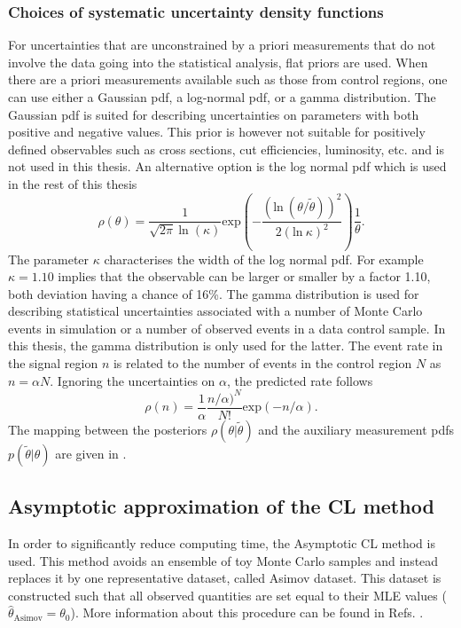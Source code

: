 \subsubsection*{Choices of systematic uncertainty density functions}
For uncertainties that are unconstrained by a priori measurements that do not involve the data going into the statistical analysis, flat priors are used. When there are a priori measurements available such as those from control regions, one can use either a Gaussian pdf,  a log-normal pdf, or a  gamma distribution. The Gaussian pdf is suited for describing uncertainties on parameters with both positive and negative values. This prior is however not suitable for positively defined observables such as cross sections, cut efficiencies, luminosity, etc. and is not used in this thesis. An alternative option is the log normal pdf which is used in the rest of this thesis
\begin{equation}
  \rho(\theta) = \frac{1}{\sqrt{2\pi} \:\mathrm{ln}\;(\kappa)} \mathrm{exp}\left(-\frac{(\mathrm{ln}\:(\theta/\tilde{\theta}))^2}{2 (\mathrm{ln}\: \kappa)^2}\right) \frac{1}{\theta}. 
\end{equation}
The parameter $\kappa$ characterises the width of the log normal pdf. For example $\kappa = 1.10$ implies that the observable can be larger or smaller by a factor 1.10, both deviation having a chance of 16\%. The gamma distribution is used for describing statistical uncertainties associated with a number of Monte Carlo events in simulation or a number of observed events in a data control sample. In this thesis, the gamma distribution is only used for the latter. The event rate in the signal region $n$ is related to the number of events in the control region $N$ as $n= \alpha N$. Ignoring the uncertainties on $\alpha$, the predicted rate follows 
\begin{equation}
	\rho(n) = \frac{1}{\alpha} \frac{n/\alpha)^N}{N!} \mathrm{exp}(-n/\alpha). 
\end{equation}
The mapping between the posteriors $\rho(\theta|\tilde{\theta})$ and the auxiliary measurement pdfs $p(\tilde{\theta}|\theta)$ are given in \cite{CMS-NOTE-2011-005}.


\subsection{Asymptotic approximation of the CL method}
\label{sec:NuisAsym}
In order to significantly reduce computing time, the Asymptotic CL method is used. This method  avoids an ensemble of toy Monte Carlo samples and instead replaces it by one representative dataset, called Asimov dataset. This dataset is constructed such that all observed quantities are set equal to their MLE values ($\hat{\theta}_{\mathrm{Asimov}}= \theta_0$). More information about this procedure can be found in Refs. \cite{Cowan:2010js}.
